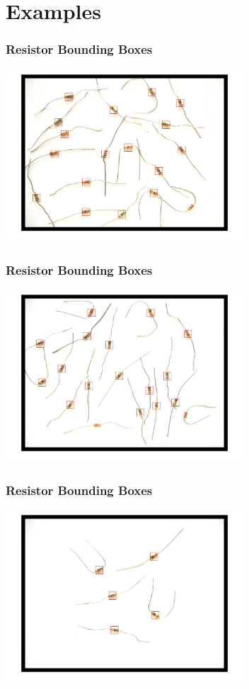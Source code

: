 \documentclass{beamer}
\begin{document}
\section{Examples}
\begin{frame}
\frametitle{Resistor Bounding Boxes}
\begin{center}
\includegraphics[width=3.5in]{images/example2/bbs.jpg}
\end{center}
\end{frame}

\begin{frame}
\frametitle{Resistor Bounding Boxes}
\begin{center}
\includegraphics[width=3.5in]{images/example3/bbs.jpg}
\end{center}
\end{frame}

\begin{frame}
\frametitle{Resistor Bounding Boxes}
\begin{center}
\includegraphics[width=3.5in]{images/example6/bbs.jpg}
\end{center}
\end{frame}
\end{document}
